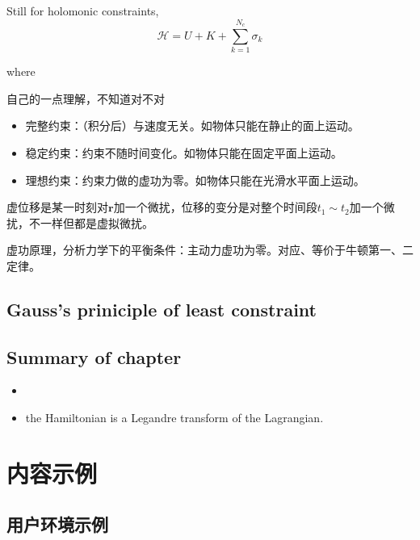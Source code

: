 \documentclass[
  10pt,
  twoside,
  openany,
  b5paper, %
  colorscheme = bootstrap-v4, %
]{qyxf-book}
\numberwithin{equation}{section}
\newcommand{\vr}{\boldsymbol{r}}
\newcommand{\ham}{\mathcal{H}} %
\begin{document}
Still for holomonic constraints,
\begin{equation}
	\ham=U+K+\sum_{k=1}^{N_c}\sigma_k
\end{equation}

where





\supplement 自己的一点理解，不知道对不对

\begin{itemize}
	\item 完整约束：（积分后）与速度无关。如物体只能在静止的面上运动。
	\item 稳定约束：约束不随时间变化。如物体只能在固定平面上运动。
	\item 理想约束：约束力做的虚功为零。如物体只能在光滑水平面上运动。
\end{itemize}

虚位移是某一时刻对$\vr$加一个微扰，位移的变分是对整个时间段$t_1\sim t_2$加一个微扰，不一样但都是虚拟微扰。

虚功原理，分析力学下的平衡条件：主动力虚功为零。对应、等价于牛顿第一、二定律。

\section{Gauss's priniciple of least constraint}





\section{}


\section{Summary of chapter}

\begin{itemize}
	\item 
	\item the Hamiltonian is a Legandre transform of the Lagrangian.
\end{itemize}








\chapter{内容示例}
\section{用户环境示例}
\end{document}
